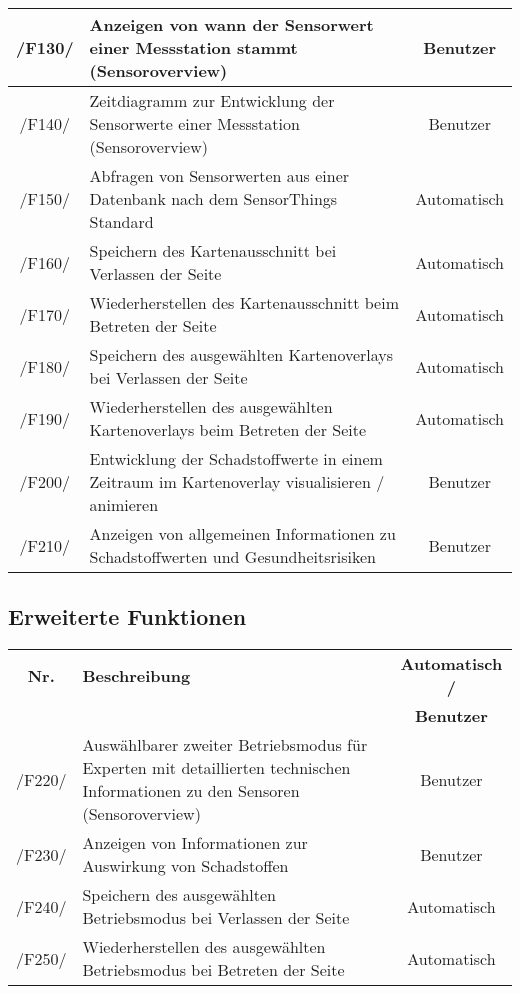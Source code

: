 \begin{tabularx}{\textwidth}{| c | X | c |}
        \hline
        /F130/ & Anzeigen von wann der Sensorwert einer Messstation stammt (Sensoroverview) & Benutzer \\
        \hline
        /F140/ & Zeitdiagramm zur Entwicklung der Sensorwerte einer Messstation (Sensoroverview) & Benutzer \\
        \hline
        /F150/ & Abfragen von Sensorwerten aus einer Datenbank nach dem SensorThings Standard & Automatisch \\
        \hline
        /F160/ & Speichern des Kartenausschnitt bei Verlassen der Seite & Automatisch \\
        \hline
        /F170/ & Wiederherstellen des Kartenausschnitt beim Betreten der Seite & Automatisch \\
        \hline
        /F180/ & Speichern des ausgewählten Kartenoverlays bei Verlassen der Seite & Automatisch \\
        \hline
        /F190/ & Wiederherstellen des ausgewählten Kartenoverlays beim Betreten der Seite & Automatisch \\
        \hline
        /F200/ & Entwicklung der Schadstoffwerte in einem Zeitraum im Kartenoverlay visualisieren / animieren & Benutzer \\
        \hline
        /F210/ & Anzeigen von allgemeinen Informationen zu Schadstoffwerten und Gesundheitsrisiken & Benutzer \\
        \hline
\end{tabularx}
\subsection{Erweiterte Funktionen}
\begin{tabularx}{\textwidth}{| c | X | c |}
\hline
        \textbf{Nr.} & 
        \textbf{Beschreibung} & 
        \textbf{Automatisch /} \\
        & & \textbf{Benutzer} \\
        \hline
        /F220/ & Auswählbarer zweiter Betriebsmodus für Experten mit detaillierten technischen Informationen zu den Sensoren (Sensoroverview) & Benutzer \\
        \hline
        /F230/ & Anzeigen von Informationen zur Auswirkung von Schadstoffen & Benutzer \\
        \hline
        /F240/ & Speichern des ausgewählten Betriebsmodus bei Verlassen der Seite & Automatisch \\
        \hline
        /F250/ & Wiederherstellen des ausgewählten Betriebsmodus bei Betreten der Seite & Automatisch \\
        \hline
\end{tabularx}